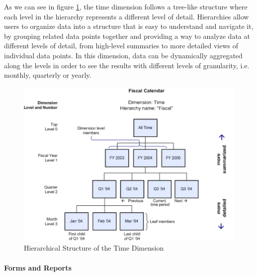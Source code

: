 \documentclass[12pt,a4paper,openright,twoside]{book}
\begin{document}
As we can see in figure \ref{fig:hierarchy}, the time dimension follows a tree-like structure where each level in the hierarchy represents a different level of detail. 
%
Hierarchies allow users to organize data into a structure that is easy to understand and navigate it, by grouping related data points together and providing a way to analyze data at different levels of detail, from high-level summaries to more detailed views of individual data points.
%
In this dimension, data can be dynamically aggregated along the levels in order to see the results with different levels of granularity, i.e. monthly, quarterly or yearly.

\begin{figure}[htbp]
	\centering
	\includegraphics[width=\linewidth]{figures/hierarchy.pdf}
	\caption{Hierarchical Structure of the Time Dimension}
	\label{fig:hierarchy}
\end{figure}

\paragraph{Forms and Reports}
\end{document}
